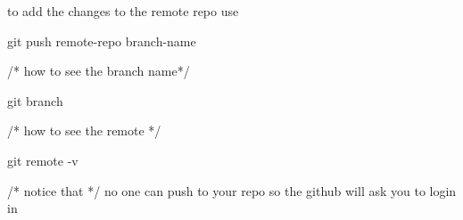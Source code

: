 to add the changes to the remote repo use 

git push remote-repo branch-name 

/* how to see the branch name*/

git branch 

/* how to see the remote */

git remote -v 


/*  notice that */
no one can push to your repo so the github will ask you to login in 